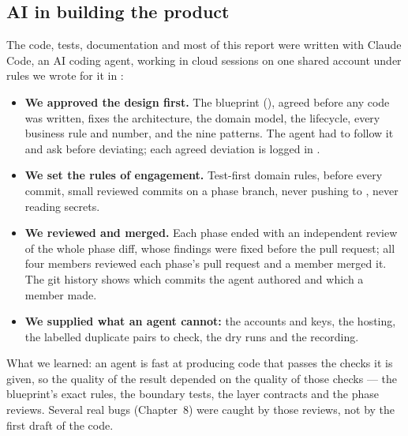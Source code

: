 \subsection*{AI in building the product}
The code, tests, documentation and most of this report were written with Claude Code, an AI
coding agent, working in cloud sessions on one shared account under rules we wrote for it in
:
\begin{itemize}
  \item \textbf{We approved the design first.} The blueprint (),
    agreed before any code was written, fixes the
    architecture, the domain model, the lifecycle, every business rule and number, and the
    nine patterns. The agent had to follow it and ask before deviating; each agreed deviation
    is logged in .
  \item \textbf{We set the rules of engagement.} Test-first domain rules, 
    before every commit, small reviewed commits on a phase branch, never pushing to
    , never reading secrets.
  \item \textbf{We reviewed and merged.} Each phase ended with an independent review of the whole
    phase diff, whose findings were fixed before the pull request; all four members reviewed
    each phase's pull request and a member merged it. The git history shows which commits the
    agent authored and which a member made.
  \item \textbf{We supplied what an agent cannot:} the accounts and keys, the hosting, the
    labelled duplicate pairs to check, the dry runs and the recording.
\end{itemize}
What we learned: an agent is fast at producing code that passes the checks it is given, so the
quality of the result depended on the quality of those checks --- the blueprint's exact rules,
the boundary tests, the layer contracts and the phase reviews. Several real bugs (Chapter~8)
were caught by those reviews, not by the first draft of the code.


